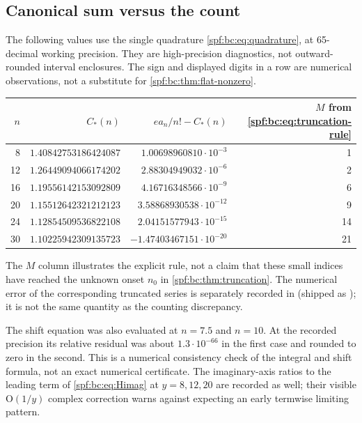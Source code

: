 \documentclass[11pt]{article}
\numberwithin{equation}{section}
\theoremstyle{definition}
\theoremstyle{remark}
\theoremstyle{definition}
\newcommand{\bigO}{\mathrm O}
\newcommand{\bcC}{C_{\!*}}
\begin{document}
\subsection{Canonical sum versus the count}

The following values use the single quadrature \eqref{spf:bc:eq:quadrature}, at
65-decimal working precision. They are high-precision diagnostics, not
outward-rounded interval enclosures. The sign and displayed digits in a row
are numerical observations, not a substitute for \cref{spf:bc:thm:flat-nonzero}.

\begin{center}
\small
\renewcommand{\arraystretch}{1.18}
\begin{tabular}{rrrr}
\toprule
$n$ & $\bcC(n)$ & $e a_n/n!-\bcC(n)$ & $M$ from \eqref{spf:bc:eq:truncation-rule}\\
\midrule
8  & $1.40842753186424087$ & $1.00698960810\cdot10^{-3}$ & 1\\
12 & $1.26449094066174202$ & $2.88304949032\cdot10^{-6}$ & 2\\
16 & $1.19556142153092809$ & $4.16716348566\cdot10^{-9}$ & 6\\
20 & $1.15512642321212123$ & $3.58868930538\cdot10^{-12}$ & 9\\
24 & $1.12854509536822108$ & $2.04151577943\cdot10^{-15}$ & 14\\
30 & $1.10225942309135723$ & $-1.47403467151\cdot10^{-20}$ & 21\\
\bottomrule
\end{tabular}
\end{center}
The $M$ column illustrates the explicit rule, not a claim that these small
indices have reached the unknown onset $n_0$ in \cref{spf:bc:thm:truncation}.
The numerical error of the corresponding truncated series is separately
recorded in  (shipped as
); it is not the same
quantity as the counting discrepancy.

The shift equation was also evaluated at $n=7.5$ and $n=10$. At the recorded
precision its relative residual was about $1.3\cdot10^{-66}$ in the first
case and rounded to zero in the second. This is a numerical consistency
check of the integral and shift formula, not an exact numerical certificate.
The imaginary-axis ratios to the leading term of \eqref{spf:bc:eq:Himag} at
$y=8,12,20$ are recorded as well; their visible $\bigO(1/y)$ complex
correction warns against expecting an early termwise limiting pattern.
\end{document}
